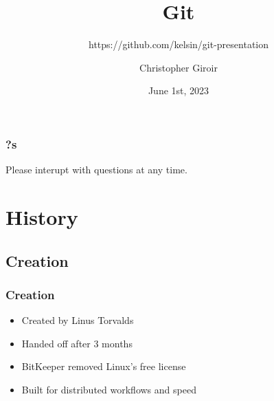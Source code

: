 \usepackage{color}
\usepackage{float}
\usepackage{hyperref}



\usepackage{beamerthemesplit}


\title{Git}
\subtitle{https://github.com/kelsin/git-presentation}
\author{Christopher Giroir}
\date{June 1st, 2023}

\newcommand{\dia}[1]{\begin{figure}[H]\centerline{\xymatrix{#1}}\end{figure}}
\newcommand{\code}[2]{\ttfamily\begin{block}{\textnormal{#1}}#2\end{block}\normalfont}



\maketitle

\begin{frame}
  \titlepage
\end{frame}

\begin{frame}
  \tableofcontents[hideallsubsections]
\end{frame}

\begin{frame}
  \frametitle{?s}
  Please interupt with questions at any time.
\end{frame}

\section{History}

\subsection{Creation}

\begin{frame}
  \frametitle{Creation}
  \begin{itemize}
  \item Created by Linus Torvalds
  \pause
  \item Handed off after 3 months
  \pause
  \item BitKeeper removed Linux's free license
  \pause
  \item Built for distributed workflows and speed
  \end{itemize}
\end{frame}

